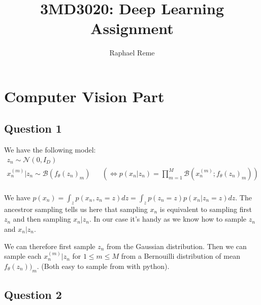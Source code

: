 \documentclass{article}
\title{3MD3020: Deep Learning Assignment}
\author{Raphael Reme}
\begin{document}
\maketitle


\section{Computer Vision Part}

\subsection*{Question 1}

We have the following model:
\begin{equation*}
    \begin{aligned}
        z_n \sim  \mathcal{N}(0, I_D)                                                                                                                                        \\
        x_n^{(m)} | z_n \sim \mathcal{B}(f_\theta(z_n)_m) &  & \left(\Leftrightarrow p(x_n | z_n) = \prod_{m=1}^M\mathcal{B}\left(x_n^{(m)} ; f_\theta(z_n)_m\right) \right) \\
    \end{aligned}
\end{equation*}

We have $p(x_n) = \int_z p(x_n, z_n=z) dz = \int_z p(z_n=z)p(x_n | z_n = z) dz$. The ancestror sampling tells us here that sampling
$x_n$ is equivalent to sampling first $z_n$ and then sampling $x_n | z_n$. In our case it's handy as we know how to sample $z_n$ and $x_n | z_n$.

We can therefore first sample $z_n$ from the Gaussian distribution. Then we can sample each $x_n^{(m)} | z_n$ for $1 \le m \le M$ from a Bernouilli
distribution of mean $f_\theta(z_n))_m$. (Both easy to sample from with python).

\subsection*{Question 2}
\end{document}
